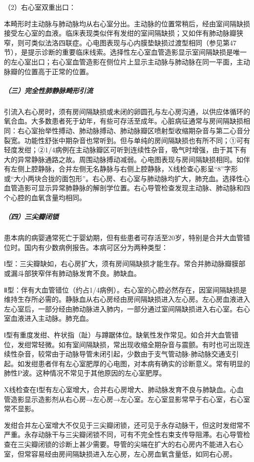 \hypertarget{text00120.htmlux5cux23CHP14-5-1-5-1-2-2-2}{}
（2）右心室双重出口：

本畸形时主动脉与肺动脉均从右心室分出。主动脉的位置常稍后，经由室间隔缺损接受左心室的血液。临床表现类似伴有发绀的室间隔缺损；又如伴有肺动脉瓣狭窄，则可类似法洛四联症。心电图表现与心内膜垫缺损过渡型相同（参见第47节），是提示诊断的重要临床线索。选择性左心室血管造影显示室间隔缺损是唯一的左心室出口；右心室血管造影在侧位片上显示主动脉与肺动脉在同一平面，主动脉瓣的位置高于正常的位置。

\subparagraph{（三）完全性肺静脉畸形引流}

引流入右心房时，须有房间隔缺损或未闭的卵圆孔与左心房沟通，以供应体循环的氧合血。大多数患者死于幼年，有些可存活至成年。心脏病征通常与房间隔缺损相同：右心室抬举性搏动、肺动脉搏动、肺动脉瓣区喷射型收缩期杂音与第二心音分裂宽。功能性舒张中期杂音也常听到。但与单纯的房间隔缺损也有所不同；①可有轻度发绀；②1/4病例在主动脉瓣区可听到连续性杂音，吸气时增强，由于其下有大的异常静脉通路之故。周围动脉搏动减弱。心电图表现与房间隔缺损相同。如伴有左侧上腔静脉，合并左侧无名静脉与右侧上腔静脉，X线检查心影呈“8”字形或“大小两块合拢的面包形”。右心房、右心室与肺动脉均扩大，肺充血。选择性心血管造影可显示异常肺静脉的解剖学位置。右心导管检查发现主动脉、肺动脉和四个心腔的血氧含量均相同。

\subparagraph{（四）三尖瓣闭锁}

患本病的病婴通常死亡于婴幼期，但有些患者可存活至20岁，特别是合并大血管错位时。国内有少数病例报告。本病可区分为两种类型：

Ⅰ型：三尖瓣缺如，右心房扩大，须有房间隔缺损才能生存。常合并肺动脉瓣膜部或漏斗部狭窄伴有肺动脉发育不良。肺缺血。

Ⅱ型：伴有大血管错位（约占1/4病例）。右心室的心腔必然存在，因室间隔缺损是维持生存所必需的。静脉血从右心房经由房间隔缺损进入左心房。左心房血液进入左心室后，一部分经由肺动脉进入肺内，一部分通过室间隔缺损进入右心室。右心室血液进入主动脉。肺充血。

Ⅰ型有重度发绀、杵状指（趾）与蹲踞体位。缺氧性发作常见。如合并大血管错位，发绀常轻微。如有室间隔缺损，常出现收缩全期杂音与震颤。有时也可出现连续性杂音，较常由于动脉导管未闭引起，少数由于支气管动脉-肺动脉交通支引起。如发绀患者伴有左心室肥厚的心电图，对本病有确实的诊断意义。常有明显的肺性P波。这种情况不常见于其他原因的左心室肥厚。

X线检查在Ⅰ型有左心室增大，合并右心房增大、肺动脉发育不良与肺缺血。心血管造影显示造影剂从右心房→左心房→左心室。左心室显影常早于右心室，右心室常不显影。

发绀合并左心室增大不仅见于三尖瓣闭锁，还可见于永存动脉干，但这时发绀常不严重。永存动脉干与三尖瓣闭锁不同，可有不完全性右束支传导阻滞。右心导管检查在三尖瓣闭锁的诊断上甚少需要。导管的尖端在扩大的右心房内不能进入右心室，但常容易经由房间隔缺损进入左心房，左心房血氧含量低，如同右心房。

